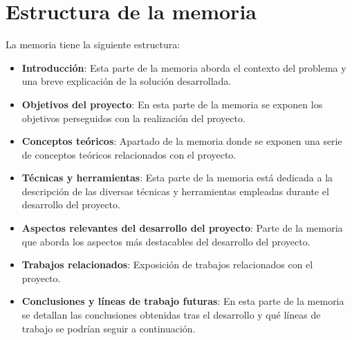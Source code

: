 \section{Estructura de la memoria}

La memoria tiene la siguiente estructura:

\begin{itemize}
\tightlist
	\item \textbf{Introducción}: Esta parte de la memoria aborda el contexto del problema y una breve explicación de la solución desarrollada.
	\item \textbf{Objetivos del proyecto}: En esta parte de la memoria se exponen los objetivos perseguidos con la realización del proyecto. 
	\item \textbf{Conceptos teóricos}: Apartado de la memoria donde se exponen una serie de conceptos teóricos relacionados con el proyecto.
	\item \textbf{Técnicas y herramientas}: Esta parte de la memoria está dedicada a la descripción de las diversas técnicas y herramientas empleadas durante el desarrollo del proyecto.
	\item \textbf{Aspectos relevantes del desarrollo del proyecto}: Parte de la memoria que aborda los aspectos más destacables del desarrollo del proyecto.
	\item \textbf{Trabajos relacionados}: Exposición de trabajos relacionados con el proyecto.
	\item \textbf{Conclusiones y líneas de trabajo futuras}: En esta parte de la memoria se detallan las conclusiones obtenidas tras el desarrollo y qué líneas de trabajo se podrían seguir a continuación.
\end{itemize}
